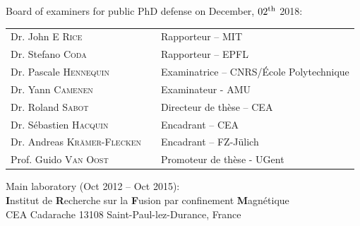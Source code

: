 \begin{titlepage}
\begin{center}
{\normalsize Board of examiners for public PhD defense on December, $02^{\rm th}$ 2018:}\\
\vspace{.4cm}
\begin{tabular}{lcl}
\hline
    Dr. John E \textsc{Rice}  & \hspace{0cm} & Rapporteur -- MIT\\
    Dr. Stefano \textsc{Coda}  & \hspace{0cm} &  Rapporteur -- EPFL\\
    Dr. Pascale \textsc{Hennequin}  & \hspace{0cm} & Examinatrice -- CNRS/\'Ecole Polytechnique\\
    Dr. Yann \textsc{Camenen} & \hspace{0cm} & Examinateur - AMU\\
    Dr. Roland \textsc{Sabot}  & \hspace{0cm} & Directeur de thèse -- CEA\\
    Dr. Sébastien \textsc{Hacquin}  & \hspace{0cm} & Encadrant -- CEA \\
    Dr. Andreas \textsc{Kr\"amer-Flecken}  & \hspace{0cm} & Encadrant -- FZ-Jülich \\
    Prof. Guido \textsc{Van Oost} & \hspace{0cm} & Promoteur de thèse - UGent\\

\hline
\end{tabular}

\vspace{.4cm}
Main laboratory (Oct 2012 -- Oct 2015):\\
\textbf{I}nstitut de \textbf{R}echerche sur la \textbf{F}usion par confinement \textbf{M}agnétique\\
CEA Cadarache 13108 Saint-Paul-lez-Durance, France\\


\end{center}


\end{titlepage}


